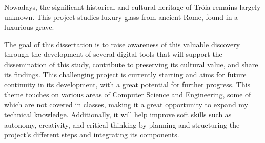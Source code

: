 
%


%




Nowadays, the significant historical and cultural heritage of Tróia remains largely unknown. 
This project studies luxury glass from ancient Rome, found in a luxurious grave.


The goal of this dissertation is to raise awareness of this valuable discovery through the development of several digital tools 
that will support the dissemination of this study, contribute to preserving its cultural value, and share its findings. 
This challenging project is currently starting and aims for future continuity in its development, with a great potential for further progress. 
This theme touches on various areas of Computer Science and Engineering, some of which are not covered in classes, making it a great opportunity to expand my technical knowledge. 
Additionally, it will help improve soft skills such as autonomy, creativity, and critical thinking by planning and structuring the project's different steps and integrating its components.


